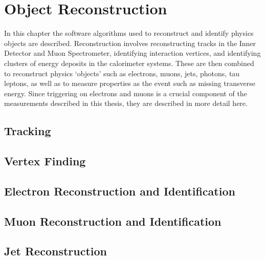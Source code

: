 \graphicspath{{Chapters/Reconstruction/Figures/}}
\label{chap:Reconstruction}
\chapter{Object Reconstruction}

In this chapter the software algorithms used to reconstruct and identify physics
objects are described. Reconstruction involves reconstructing tracks in the
Inner Detector and Muon Spectrometer, identifying interaction vertices,
and identifying clusters of energy deposits in the calorimeter systems. These are
then combined to reconstruct physics `objects' such as electrons, muons, jets, photons,
tau leptons, as well as to measure properties as the event such as missing
transverse energy. 
Since triggering on electrons and muons is a crucial component of the
measurements described in this thesis, they are described in more detail here.

\section{Tracking}
\label{sec:reco-tracking}


\section{Vertex Finding}
\label{sec:reco-vertexing}


\section{Electron Reconstruction and Identification}
\label{sec:reco-el}


\section{Muon Reconstruction and Identification}
\label{sec:reco-mu}

\section{Jet Reconstruction}
\label{sec:reco-jet}

